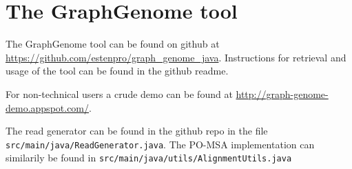 \documentclass[thesis.tex]{subfiles}
\begin{document}
\chapter{The GraphGenome tool}
\label{sec:tool}
The GraphGenome tool can be found on github at \url{https://github.com/estenpro/graph_genome_java}. Instructions for retrieval and usage of the tool can be found in the github readme.\\
\par\noindent
For non-technical users a crude demo can be found at \url{http://graph-genome-demo.appspot.com/}.\\
\par\noindent
The read generator can be found in the github repo in the file \texttt{src/main/java/ReadGenerator.java}. The PO-MSA implementation can similarily be found in \texttt{src/main/java/utils/AlignmentUtils.java}
\end{document}
